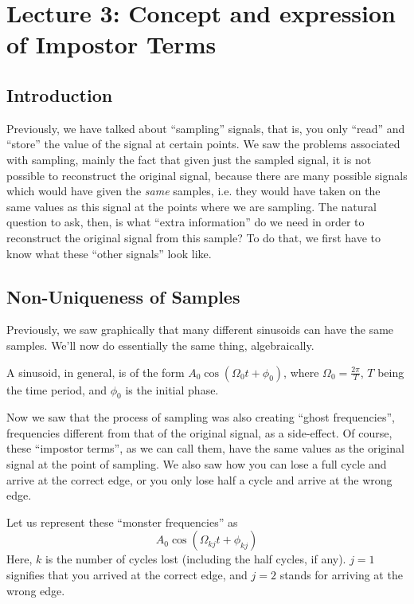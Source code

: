 \section{Lecture 3: Concept and expression of Impostor Terms}

\subsection{Introduction}
Previously, we have talked about ``sampling'' signals, that is, you only ``read'' and ``store'' the value of the signal at certain points. We saw the problems associated with sampling, mainly the fact that given just the sampled signal, it is not possible to reconstruct the original signal, because there are many possible signals which would have given the \emph{same} samples, i.e. they would have taken on the same values as this signal at the points where we are sampling. The natural question to ask, then, is what ``extra information'' do we need in order to reconstruct the original signal from this sample? To do that, we first have to know what these ``other signals'' look like.

\subsection{Non-Uniqueness of Samples}

Previously, we saw graphically that many different sinusoids can have the same samples. We'll now do essentially the same thing, algebraically.

A sinusoid, in general, is of the form $A_0\cos(\Omega_0 t +\phi_0)$, where $\Omega_0 = \frac{2\pi}{T}$, $T$ being the time period, and $\phi_0$ is the initial phase.

Now we saw that the process of sampling was also creating ``ghost frequencies'', frequencies different from that of the original signal, as a side-effect. Of course, these ``impostor terms'', as we can call them, have the same values as the original signal at the point of sampling. We also saw how you can lose a full cycle and arrive at the correct edge, or you only lose half a cycle and arrive at the wrong edge.

Let us represent these ``monster frequencies'' as 
\begin{equation}
\label{eqn:rep}
A_0\cos(\Omega_{kj} t +\phi_{kj})
\end{equation}
Here, $k$ is the number of cycles lost (including the half cycles, if any). $j=1$ signifies that you arrived at the correct edge, and $j=2$ stands for arriving at the wrong edge.

